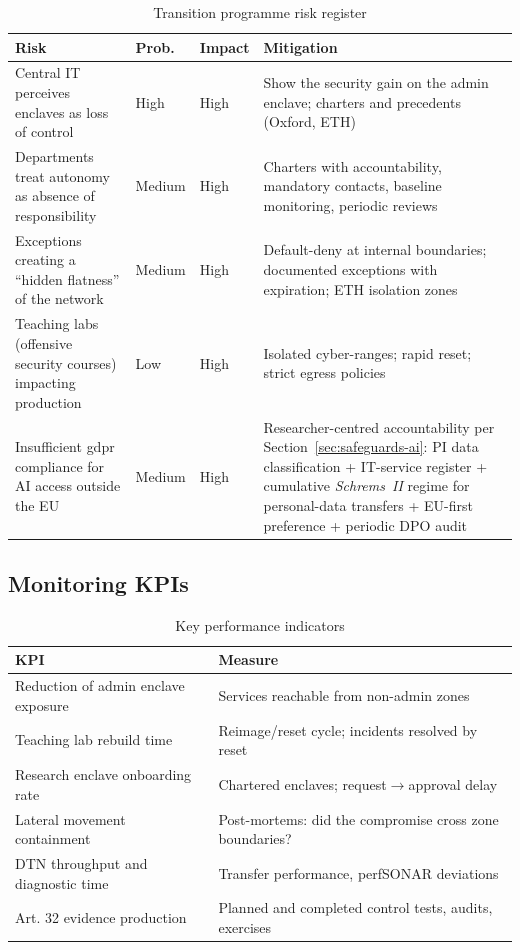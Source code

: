 \begin{table}[H]
\centering
\caption{Transition programme risk register}
\label{tab:risques}
\small
\begin{tabularx}{\textwidth}{X l l X}
\toprule
\textbf{Risk} & \textbf{Prob.} & \textbf{Impact} &
    \textbf{Mitigation} \\
\midrule
Central IT perceives enclaves as loss of control &
    High & High & Show the security gain on the admin enclave;
    charters and precedents (Oxford, ETH) \\
\addlinespace
Departments treat autonomy as absence of responsibility &
    Medium & High & Charters with accountability, mandatory contacts,
    baseline monitoring, periodic reviews \\
\addlinespace
Exceptions creating a ``hidden flatness'' of the network &
    Medium & High & Default-deny at internal boundaries; documented
    exceptions with expiration; ETH isolation zones \\
\addlinespace
Teaching labs (offensive security courses) impacting production &
    Low & High & Isolated cyber-ranges; rapid reset; strict
    egress policies \\
\addlinespace
Insufficient \gls{gdpr} compliance for AI access outside the EU &
    Medium & High & Researcher-centred accountability per
    Section~\ref{sec:safeguards-ai}: PI data classification +
    IT-service register + cumulative \emph{Schrems~II} regime for
    personal-data transfers + EU-first preference + periodic DPO
    audit~\cite{schrems2020} \\
\bottomrule
\end{tabularx}
\end{table}

\subsection{Monitoring KPIs}

\begin{table}[H]
\centering
\caption{Key performance indicators}
\label{tab:kpi}
\small
\begin{tabularx}{\textwidth}{X X}
\toprule
\textbf{KPI} & \textbf{Measure} \\
\midrule
Reduction of admin enclave exposure & Services reachable
    from non-admin zones \\
\addlinespace
Teaching lab rebuild time & Reimage/reset cycle;
    incidents resolved by reset \\
\addlinespace
Research enclave onboarding rate & Chartered enclaves;
    request$\rightarrow$approval delay \\
\addlinespace
Lateral movement containment & Post-mortems: did the compromise
    cross zone boundaries? \\
\addlinespace
DTN throughput and diagnostic time & Transfer performance, perfSONAR
    deviations \\
\addlinespace
Art. 32 evidence production & Planned and completed control tests,
    audits, exercises \\
\bottomrule
\end{tabularx}
\end{table}

